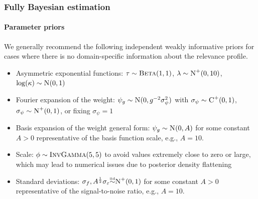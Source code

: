\documentclass{snedecorbeamer}
\begin{document}
\begin{frame}%
  \label{frm:bayesian-priors}
  \frametitle{Fully Bayesian estimation}
  \framesubtitle{Parameter priors}

  We generally recommend the following independent weakly informative priors for
  cases where there is no domain-specific information about the relevance profile.
  \begin{itemize}
  \item Asymmetric exponential functions:
    $\tau \sim \textsc{Beta}(1, 1)$,
    $\lambda \sim \textsc{N}^{+}(0, 10)$,
    $\log(\kappa) \sim \textsc{N}(0, 1)$
  \item Fourier expansion of the weight:
    $\psi_g\sim\textsc{N}(0, g^{-2}\sigma^2_\psi)$ with
    $\sigma_\psi\sim\textsc{C}^+(0, 1)$, $\sigma_\psi\sim\textsc{N}^+(0, 1)$,
    or fixing $\sigma_\psi = 1$
  \item Basis expansion of the weight general form:
    $\psi_g \sim \textsc{N}(0, A)$ for some constant
    $A>0$ representative of the basis function scale, e.g., $A = 10$.
  \item Scale: $\phi \sim \textsc{InvGamma}(5, 5)$ to avoid
    values extremely close to zero or large, which may lead to numerical issues
    due to posterior density flattening
  \item Standard deviations: $\sigma_f, A^{\frac{1}{2}}\sigma_{\varepsilon}
    \smash{\overset{\text{\tiny iid}}{\sim}} \textsc{N}^{+}(0, 1)$ for some constant $A>0$
    representative of the signal-to-noise ratio, e.g., $A = 10$.
  \end{itemize}
\end{frame}
\end{document}
